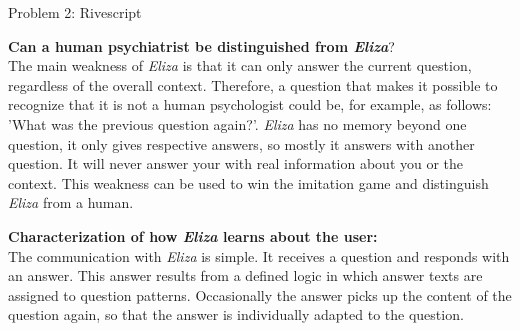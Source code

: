 \documentclass[12pt,a4paper]{article}
\begin{document}
{
\begin{center}
\begin{Large}
Problem 2: Rivescript
\end{Large}
\end{center}
\textbf{Can a human psychiatrist be distinguished from \textit{Eliza}}?\\

The main weakness of \textit{Eliza} is that it can only answer the current question, regardless of the overall context. 
Therefore, a question that makes it possible to recognize that it is not a human psychologist could be, for example, as follows: 'What was the previous question again?'.
\textit{Eliza} has no memory beyond one question, it only gives respective answers, so mostly it answers with another question. It will never answer your with real information about you or the context. This weakness can be used to win the imitation game and distinguish \textit{Eliza} from a human.
\newline


\noindent \textbf{Characterization of how \textit{Eliza} learns about the user:}\\

The communication with \textit{Eliza} is simple. It receives a question and responds with an answer. This answer results from a defined logic in which answer texts are assigned to question patterns. Occasionally the answer picks up the content of the question again, so that the answer is individually adapted to the question.\\

}
\end{document}
